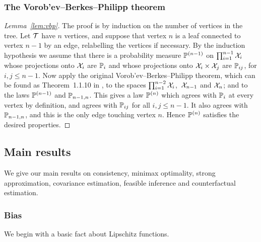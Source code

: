 \subsubsection{The Vorob'ev--Berkes--Philipp theorem}

\begin{proof}[Lemma~\ref{lem:vbp}]

  The proof is by induction on the number of vertices in the tree.
  Let $\cT$ have $n$ vertices,
  and suppose
  that vertex $n$ is a leaf
  connected to vertex $n-1$ by an edge,
  relabelling the vertices if necessary.
  By the induction hypothesis we assume that there is a
  probability measure $\P^{(n-1)}$
  on $\prod_{i=1}^{n-1} \cX_i$
  whose projections onto $\cX_i$ are $\P_i$
  and whose projections onto $\cX_i \times \cX_j$ are $\P_{ij}$,
  for $i,j \leq n-1$.
  Now apply the original
  Vorob'ev--Berkes--Philipp theorem,
  which can be found as Theorem~1.1.10 in
  \citet{dudley1999uniform},
  to the spaces
  $\prod_{i=1}^{n-2} \cX_i$,\,
  $\cX_{n-1}$ and
  $\cX_n$;
  and to the laws
  $\P^{(n-1)}$
  and
  $\P_{n-1, n}$.
  This gives a law $\P^{(n)}$
  which agrees with $\P_i$
  at every vertex by definition,
  and agrees with
  $\P_{ij}$ for all $i,j \leq n-1$.
  It also agrees with $\P_{n-1,n}$,
  and this is the only edge touching vertex $n$.
  Hence $\P^{(n)}$ satisfies the desired properties.
\end{proof}

\subsection{Main results}

We give our main results on
consistency, minimax optimality, strong approximation,
covariance estimation, feasible inference
and counterfactual estimation.

\subsubsection{Bias}

We begin with a basic fact about Lipschitz functions.

